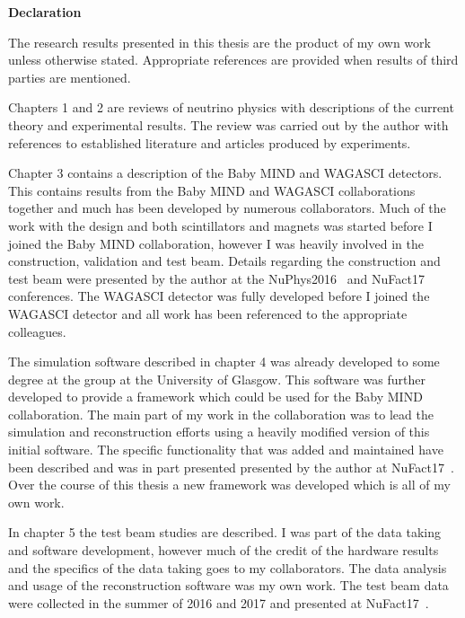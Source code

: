 \vspace*{0.75in}
\begin{center} {\bf Declaration}\end{center}


The research results presented in this thesis are the product of my own work unless otherwise stated. Appropriate references are provided when results of third parties are mentioned. 

Chapters 1 and 2 are reviews of neutrino physics with descriptions of the current theory and experimental results. The review was carried out by the author with references to established literature and articles produced by experiments.

Chapter 3 contains a description of the Baby MIND and WAGASCI detectors. This contains results from the Baby MIND and WAGASCI collaborations together and much has been developed by numerous collaborators. Much of the work with the design and both scintillators and magnets was started before I joined the Baby MIND collaboration, however I was heavily involved in the construction, validation and test beam. Details regarding the construction and test beam were presented by the author at the NuPhys2016~\cite{51Saba, 54NUFACT2016Hallsjo} and NuFact17~\cite{82Uppsala} conferences. The WAGASCI detector was fully developed before I joined the WAGASCI detector and all work has been referenced to the appropriate colleagues.

The simulation software described in chapter 4 was already developed to some degree at the group at the University of Glasgow. This software was further developed to provide a framework which could be used for the Baby MIND collaboration. The main part of my work in the collaboration was to lead the simulation and reconstruction efforts using a heavily modified version of this initial software. The specific functionality that was added and maintained have been described and was in part presented presented by the author at NuFact17~\cite{82Uppsala}. Over the course of this thesis a new framework was developed which is all of my own work.

In chapter 5 the test beam studies are described. I was part of the data taking and software development, however much of the credit of the hardware results and the specifics of the data taking goes to my collaborators. The data analysis and usage of the reconstruction software was my own work. The test beam data were collected in the summer of 2016 and 2017 and presented at NuFact17~\cite{82Uppsala}.

